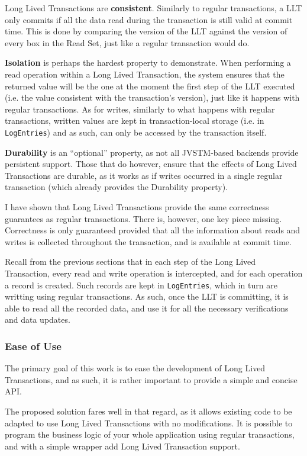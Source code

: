 \documentclass{llncs}
\begin{document}
Long Lived Transactions are {\bf consistent}. Similarly to regular
transactions, a LLT only commits if all the data read during the
transaction is still valid at commit time. This is done by comparing
the version of the LLT against the version of every box in the Read
Set, just like a regular transaction would do.

{\bf Isolation} is perhaps the hardest property to demonstrate. When
performing a read operation within a Long Lived Transaction, the
system ensures that the returned value will be the one at the moment
the first step of the LLT executed (i.e. the value consistent with the
transaction's version), just like it happens with regular
transactions.  As for writes, similarly to what happens with regular
transactions, written values are kept in transaction-local storage
(i.e. in \texttt{LogEntries}) and as such, can only be accessed by the
transaction itself.

{\bf Durability} is an ``optional'' property, as not all JVSTM-based
backends provide persistent support. Those that do however, ensure
that the effects of Long Lived Transactions are durable, as it works as
if writes occurred in a single regular transaction (which already
provides the Durability property).

I have shown that Long Lived Transactions provide the same correctness
guarantees as regular transactions. There is, however, one key piece
missing. Correctness is only guaranteed provided that all the
information about reads and writes is collected throughout the
transaction, and is available at commit time.

Recall from the previous sections that in each step of the Long Lived
Transaction, every read and write operation is intercepted, and for
each operation a record is created. Such records are kept in
\texttt{LogEntries}, which in turn are writting using regular
transactions. As such, once the LLT is committing, it is able to read
all the recorded data, and use it for all the necessary verifications
and data updates.

\subsubsection{Ease of Use}

The primary goal of this work is to ease the development of Long Lived
Transactions, and as such, it is rather important to provide a simple
and concise API.

The proposed solution fares well in that regard, as it allows existing
code to be adapted to use Long Lived Transactions with no
modifications. It is possible to program the business logic of your
whole application using regular transactions, and with a simple
wrapper add Long Lived Transaction support.
\end{document}

